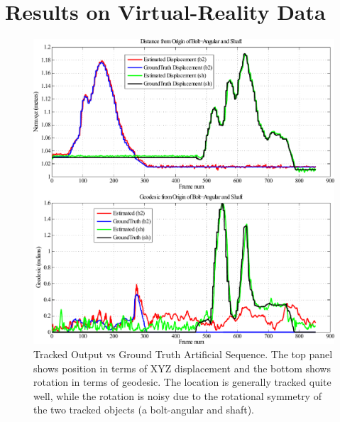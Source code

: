 \section{Results on Virtual-Reality Data}
\begin{figure}[!ht]
  \centering
  \includegraphics[width=\linewidth]{figures/Tracking/CombinedNoNoise.pdf}
  \caption[Tracked Output vs Ground Truth Artificial Sequence]{Tracked Output vs Ground Truth Artificial Sequence. The top panel shows position in terms of XYZ displacement and the bottom shows rotation in terms of geodesic. The location is generally tracked quite well, while the rotation is noisy due to the rotational symmetry of the two tracked objects (a bolt-angular and shaft).}
  \label{fig:CombinedNoNoise}
\end{figure}

